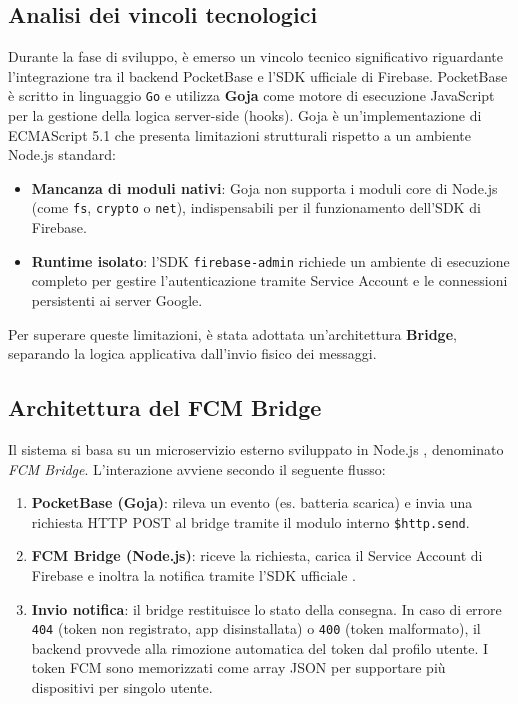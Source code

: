\documentclass[12pt,a4paper]{article}
\begin{document}
\subsection{Analisi dei vincoli tecnologici}
Durante la fase di sviluppo, è emerso un vincolo tecnico significativo riguardante 
l'integrazione tra il backend PocketBase e l'SDK ufficiale di Firebase. 
PocketBase è scritto in linguaggio \texttt{Go} e utilizza \textbf{Goja} come motore di esecuzione JavaScript 
per la gestione della logica server-side (hooks). 
Goja è un'implementazione di ECMAScript 5.1 che presenta limitazioni strutturali rispetto a un ambiente Node.js \cite{nodejs} standard:
\begin{itemize}
    \item \textbf{Mancanza di moduli nativi}: Goja non supporta i moduli core di Node.js (come \texttt{fs}, \texttt{crypto} o \texttt{net}), indispensabili per il funzionamento dell'SDK di Firebase.
    \item \textbf{Runtime isolato}: l'SDK \texttt{firebase-admin} \cite{firebase_admin} richiede un ambiente di esecuzione completo per gestire l'autenticazione tramite Service Account e le connessioni persistenti ai server Google.
\end{itemize}

Per superare queste limitazioni, è stata adottata un'architettura \textbf{Bridge}, separando la logica applicativa dall'invio fisico dei messaggi.

\subsection{Architettura del FCM Bridge}
Il sistema si basa su un microservizio esterno sviluppato in Node.js \cite{nodejs}, denominato \textit{FCM Bridge}. L'interazione avviene secondo il seguente flusso:
\begin{enumerate}
    \item \textbf{PocketBase (Goja)}: rileva un evento (es. batteria scarica) e invia una richiesta HTTP POST al bridge tramite il modulo interno \texttt{\$http.send}.
    \item \textbf{FCM Bridge (Node.js)}: riceve la richiesta, carica il Service Account di Firebase e inoltra la notifica tramite l'SDK ufficiale \cite{firebase_admin}.
    \item \textbf{Invio notifica}: il bridge restituisce lo stato della consegna. In caso di errore \texttt{404} (token non registrato, app disinstallata) o \texttt{400} (token malformato), il backend provvede alla rimozione automatica del token dal profilo utente. I token FCM sono memorizzati come array JSON per supportare più dispositivi per singolo utente.
\end{enumerate}
\end{document}
